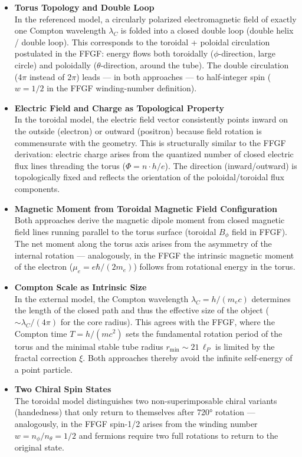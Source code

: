 \begin{itemize}
	\item \textbf{Torus Topology and Double Loop}\\
	In the referenced model, a circularly polarized electromagnetic field of exactly one Compton wavelength $\lambda_C$ is folded into a closed double loop (double helix / double loop). This corresponds to the toroidal + poloidal circulation postulated in the FFGF: energy flows both toroidally ($\phi$-direction, large circle) and poloidally ($\theta$-direction, around the tube). The double circulation (4$\pi$ instead of 2$\pi$) leads — in both approaches — to half-integer spin ($w = 1/2$ in the FFGF winding-number definition).
	
	\item \textbf{Electric Field and Charge as Topological Property}\\
	In the toroidal model, the electric field vector consistently points inward on the outside (electron) or outward (positron) because field rotation is commensurate with the geometry. This is structurally similar to the FFGF derivation: electric charge arises from the quantized number of closed electric flux lines threading the torus ($\Phi = n \cdot h/e$). The direction (inward/outward) is topologically fixed and reflects the orientation of the poloidal/toroidal flux components.
	
	\item \textbf{Magnetic Moment from Toroidal Magnetic Field Configuration}\\
	Both approaches derive the magnetic dipole moment from closed magnetic field lines running parallel to the torus surface (toroidal $B_\phi$ field in FFGF). The net moment along the torus axis arises from the asymmetry of the internal rotation — analogously, in the FFGF the intrinsic magnetic moment of the electron ($\mu_e = e\hbar / (2m_e)$) follows from rotational energy in the torus.
	
	\item \textbf{Compton Scale as Intrinsic Size}\\
	In the external model, the Compton wavelength $\lambda_C = h/(m_ec)$ determines the length of the closed path and thus the effective size of the object ($\sim \lambda_C / (4\pi)$ for the core radius). This agrees with the FFGF, where the Compton time $T = h/(m c^2)$ sets the fundamental rotation period of the torus and the minimal stable tube radius $r_{\min} \sim 21\,\ell_P$ is limited by the fractal correction $\xi$. Both approaches thereby avoid the infinite self-energy of a point particle.
	
	\item \textbf{Two Chiral Spin States}\\
	The toroidal model distinguishes two non-superimposable chiral variants (handedness) that only return to themselves after 720° rotation — analogously, in the FFGF spin-1/2 arises from the winding number $w = n_\phi / n_\theta = 1/2$ and fermions require two full rotations to return to the original state.
\end{itemize}

